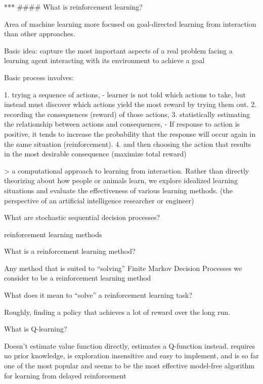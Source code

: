 \documentclass[10pt]{article}
\begin{document}
 
***
#### What is reinforcement learning?

Area of machine learning more focused on goal-directed learning from interaction than other approaches.

Basic idea: capture the most important aspects of a real problem facing a learning agent interacting with its environment to achieve a goal

Basic process involves: 

1. trying a sequence of actions, 
    - learner is not told which actions to take, but instead must discover which actions yield the most reward by trying them out.
2. recording the consequences (reward) of those actions,
3. statistically estimating the relationship between actions and consequences,
    - If response to action is positive, it tends to increase the probability that the response will occur again in the same situation (reinforcement).
4. and then choosing the action that results in the most desirable consequence (maximize total reward)

> a computational approach to learning from interaction. Rather than directly theorizing about how people or animals learn, we explore idealized learning situations and evaluate the effectiveness of various learning methods. (the perspective of an artificial intelligence researcher or engineer)


\hrulefill

What are stochastic sequential decision processes?

reinforcement learning methods

\hrulefill

What is a reinforcement learning method?

Any method that is suited to ``solving'' Finite Markov Decision Processes we consider to be a reinforcement learning method

\hrulefill

What does it mean to ``solve'' a reinforcement learning task?

Roughly, finding a policy that achieves a lot of reward over the long run.

\hrulefill

What is Q-learning?

Doesn't estimate value function directly, estimates a Q-function instead.
requires no prior knowledge, is exploration insensitive and easy to implement, and is so far one of the most popular and seems to be the most effective model-free algorithm for learning from delayed reinforcement
\end{document}
